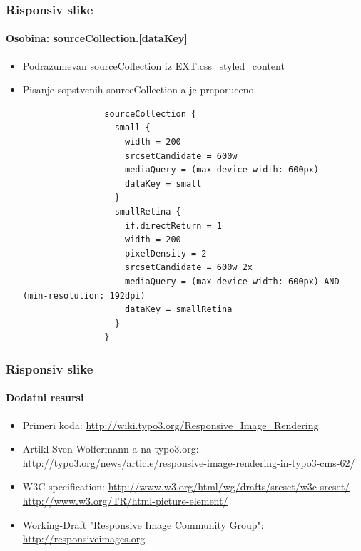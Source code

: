 
\begin{frame}[fragile]
	\frametitle{Risponsiv slike}
	\framesubtitle{Osobina: sourceCollection.[dataKey]}

	\begin{itemize}
		\item Podrazumevan sourceCollection iz EXT:css\_styled\_content
		\item Pisanje sopstvenih sourceCollection-a je preporuceno

			\lstset{
				basicstyle=\tiny\ttfamily
			}

			\begin{lstlisting}
				sourceCollection {
				  small {
				    width = 200
				    srcsetCandidate = 600w
				    mediaQuery = (max-device-width: 600px)
				    dataKey = small
				  }
				  smallRetina {
				    if.directReturn = 1
				    width = 200
				    pixelDensity = 2
				    srcsetCandidate = 600w 2x
				    mediaQuery = (max-device-width: 600px) AND (min-resolution: 192dpi)
				    dataKey = smallRetina
				  }
				}
			\end{lstlisting}
	\end{itemize}

\end{frame}


\begin{frame}[fragile]
	\frametitle{Risponsiv slike}
	\framesubtitle{Dodatni resursi}

	\begin{itemize}
		\item Primeri koda:\newline
			\small\url{http://wiki.typo3.org/Responsive_Image_Rendering}\normalsize

		\item Artikl Sven Wolfermann-a na typo3.org:\newline
			\small\url{http://typo3.org/news/article/responsive-image-rendering-in-typo3-cms-62/}\normalsize

		\item W3C specification:\newline
			\small\url{http://www.w3.org/html/wg/drafts/srcset/w3c-srcset/}\newline
			\small\url{http://www.w3.org/TR/html-picture-element/}

		\item Working-Draft "Responsive Image Community Group":\newline
			\small\url{http://responsiveimages.org}\normalsize

	\end{itemize}

\end{frame}


